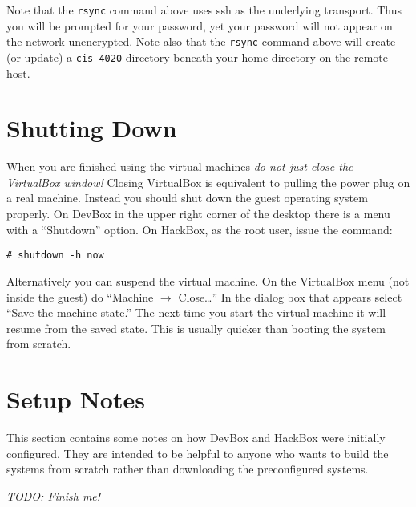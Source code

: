 \documentclass[twocolumn]{article}
\begin{document}
Note that the \texttt{rsync} command above uses ssh as the underlying transport. Thus you will
be prompted for your password, yet your password will not appear on the network unencrypted.
Note also that the \texttt{rsync} command above will create (or update) a \texttt{cis-4020}
directory beneath your home directory on the remote host.

\section{Shutting Down}

When you are finished using the virtual machines \emph{do not just close the VirtualBox window!}
Closing VirtualBox is equivalent to pulling the power plug on a real machine. Instead you should
shut down the guest operating system properly. On DevBox in the upper right corner of the
desktop there is a menu with a ``Shutdown'' option. On HackBox, as the root user, issue the
command:
\begin{Verbatim}
# shutdown -h now
\end{Verbatim}

Alternatively you can suspend the virtual machine. On the VirtualBox menu (not inside the guest)
do ``Machine $\rightarrow$ Close\ldots'' In the dialog box that appears select ``Save the
machine state.'' The next time you start the virtual machine it will resume from the saved
state. This is usually quicker than booting the system from scratch.

\section{Setup Notes}

This section contains some notes on how DevBox and HackBox were initially configured. They are
intended to be helpful to anyone who wants to build the systems from scratch rather than
downloading the preconfigured systems.

\textit{TODO: Finish me!}
\end{document}

